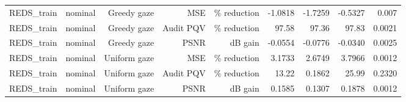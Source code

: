\begin{table}[t]
\begin{tabular}{llrrrrrrr}
REDS\_train & nominal & Greedy gaze & MSE & \% reduction & -1.0818 & -1.7259 & -0.5327 & 0.007 \\
REDS\_train & nominal & Greedy gaze & Audit PQV & \% reduction & 97.58 & 97.36 & 97.83 & 0.0021 \\
REDS\_train & nominal & Greedy gaze & PSNR & dB gain & -0.0554 & -0.0776 & -0.0340 & 0.0025 \\
REDS\_train & nominal & Uniform gaze & MSE & \% reduction & 3.1733 & 2.6749 & 3.7966 & 0.0012 \\
REDS\_train & nominal & Uniform gaze & Audit PQV & \% reduction & 13.22 & 0.1862 & 25.99 & 0.2320 \\
REDS\_train & nominal & Uniform gaze & PSNR & dB gain & 0.1585 & 0.1307 & 0.1878 & 0.0012 \\
\bottomrule
\end{tabular}
\end{table}
